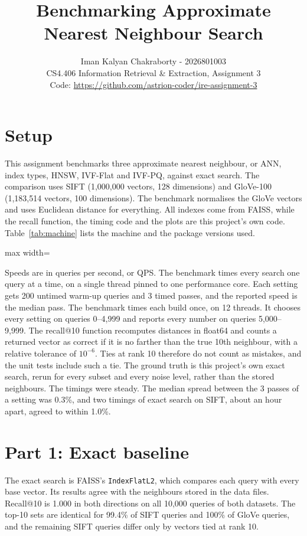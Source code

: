 \documentclass[10pt,a4paper]{article}
\title{\vspace{-1.5em}Benchmarking Approximate Nearest Neighbour Search\vspace{-0.5em}}
\author{Iman Kalyan Chakraborty - 2026801003 \\ CS4.406 Information Retrieval \& Extraction, Assignment 3 \\ \small Code: \url{https://github.com/astrion-coder/ire-assignment-3}}
\date{\vspace{-1.5em}}
\newcommand{\tableinput}[1]{\begin{adjustbox}{max width=\linewidth}\small\setlength{\tabcolsep}{4.5pt}\end{adjustbox}}
\begin{document}
\maketitle

\section{Setup}
This assignment benchmarks three approximate nearest neighbour, or ANN, index types, HNSW, IVF-Flat and IVF-PQ, against exact
search. The comparison uses SIFT (1,000,000 vectors, 128 dimensions) and GloVe-100 (1,183,514 vectors, 100 dimensions). The benchmark normalises the GloVe vectors and uses Euclidean distance for everything. All indexes come from FAISS, while the recall function, the timing code and the plots are this project's own code. Table~\ref{tab:machine} lists the machine and the package versions used.
\begin{table}[h]\centering
\tableinput{machine}
\caption{Machine and library versions, as recorded in every row of results.csv.\label{tab:machine}}
\end{table}

Speeds are in queries per second, or QPS. The benchmark times every search one query at a time, on a single thread pinned to one performance core. Each setting gets 200 untimed warm-up queries and 3 timed passes, and the reported speed is the median pass. The benchmark times each build once, on 12 threads. It chooses every setting on queries 0--4,999 and reports every number on queries 5,000--9,999. The recall@10
function recomputes distances in float64 and counts a returned vector as correct if it is no farther than the true 10th neighbour,
with a relative tolerance of $10^{-6}$. Ties at rank 10 therefore do not count as mistakes, and the unit tests include such a tie.
The ground truth is this project's own exact search, rerun for every subset and every noise level, rather than the stored neighbours. The timings were steady. The median spread between the 3 passes of a setting was 0.3\%, and two timings of exact
search on SIFT, about an hour apart, agreed to within 1.0\%.

\section{Part 1: Exact baseline}
The exact search is FAISS's \texttt{IndexFlatL2}, which compares each query with every base vector. Its results agree with the
neighbours stored in the data files. Recall@10 is 1.000 in both directions on all 10,000 queries of both datasets. The top-10 sets
are identical for 99.4\% of SIFT queries and 100\% of GloVe queries, and the remaining SIFT queries differ only by vectors tied at
rank 10.
\end{document}
